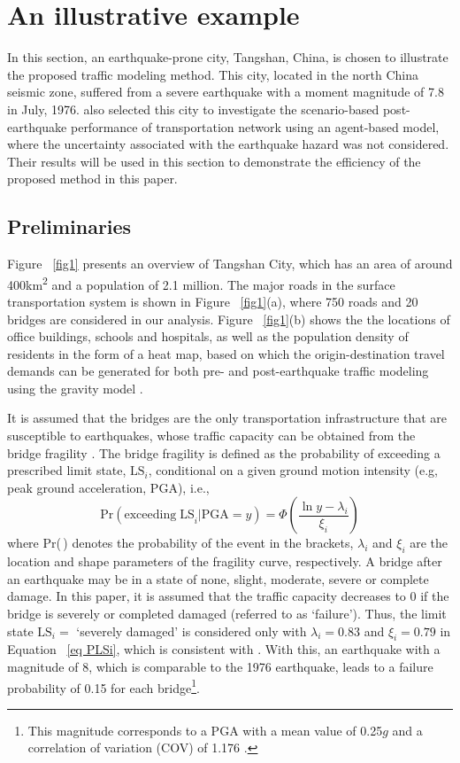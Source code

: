 \documentclass[review,11pt,nonatbib]{elsarticle}
\begin{document}
\section{An illustrative example}
In this section, an earthquake-prone city, Tangshan, China, is chosen to illustrate the proposed traffic modeling method. This city, located in the north China seismic zone, suffered from a severe earthquake with a moment magnitude of 7.8 in July, 1976.  \citet{feng2017post} also selected this city to investigate the scenario-based post-earthquake performance of transportation network using an agent-based model, where the uncertainty associated with the earthquake hazard was not considered. Their results will be used in this section to demonstrate the efficiency of the proposed method in this paper.
\subsection{Preliminaries}
Figure ~\ref{fig1} presents an overview of Tangshan City, which has an area of around 400km\textsuperscript{2} and a population of 2.1 million. The major roads in the surface transportation system is shown in Figure ~\ref{fig1}(a), where 750 roads and 20 bridges are considered in our analysis. Figure ~\ref{fig1}(b) shows the the locations of office buildings, schools and hospitals, as well as the population density of residents in the form of a heat map, based on which the origin-destination travel demands can be generated for both pre- and post-earthquake traffic modeling using the gravity model \citep{moriarty2007modeling,chang2012post}.
\par  It is assumed that the bridges are the only transportation infrastructure that are susceptible to earthquakes, whose traffic capacity can be obtained from the bridge fragility \citep{padgett2009retrofitted}. The bridge fragility is defined as the probability of exceeding a prescribed limit state, $\mathrm{LS}_i$, conditional on a given ground motion intensity (e.g, peak ground acceleration, PGA), i.e.,
\begin{equation}\label{eq PLSi}
\mathrm{Pr}(\mathrm{exceeding\;LS}_i|\mathrm{PGA}=y)=\Phi\left(\frac{\ln y - \lambda_i}{\xi_i}\right)
\end{equation}
where Pr(\,) denotes the probability of the event in the brackets, $\lambda_i$ and $\xi_i$ are the location and shape parameters of the fragility curve, respectively. A bridge after an earthquake may be in a state of none, slight, moderate, severe or complete damage. In this paper, it is assumed that the traffic capacity decreases to 0 if the bridge is severely or completed damaged (referred to as `failure'). Thus, the limit state $\mathrm{LS}_i=$ `severely damaged' is considered only with $\lambda_i=0.83$ and $\xi_i=0.79$ in Equation ~\eqref{eq PLSi}, which is consistent with \citep{Wu2014Calibration}. With this, an earthquake with a magnitude of 8, which is comparable to the 1976 earthquake, leads to a failure probability of 0.15 for each bridge\footnote{This magnitude corresponds to a PGA with a mean value of 0.25$g$ \citep{gb50011code} and a correlation of variation (COV) of 1.176 \citep{gao1985probabilistic}.}. 
\end{document}
